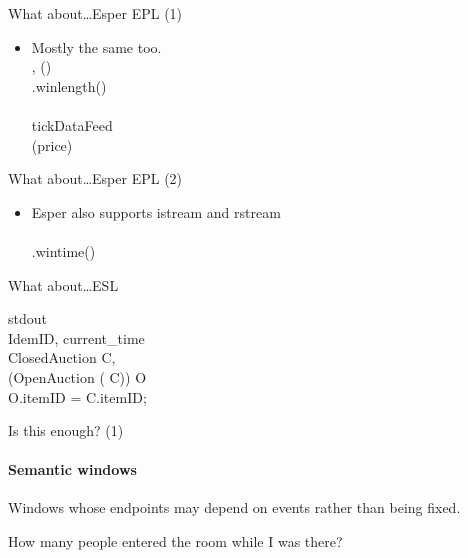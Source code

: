 \documentclass[brown, compress, mathserif]{beamer}
\begin{document}
\begin{frame}{What about\ldots Esper EPL (1)}
  \begin{itemize}
  \item Mostly the same too.
    \bigskip\\
     , ()\\
     \hlsym{(}.win\hlsym{:}length()\\
      \hlsym{$>$} \\
     tickDataFeed\\
     (price) \hlsym{$>$} 

  \end{itemize}
\end{frame}


\begin{frame}{What about\ldots Esper EPL (2)}
  \begin{itemize}
  \item Esper also supports \alert{istream} and \alert{rstream}
    \bigskip\\
     \hlsym{*}\\
     \hlsym{(}.win\hlsym{:}time()\\
  \end{itemize}
\end{frame}


\begin{frame}{What about\ldots ESL}
  \begin{footnotesize}
   stdout\\
   IdemID, current\_time \\
   ClosedAuction  C,\\
  (OpenAuction  (   C))  O\\
   O.itemID = C.itemID;
  \end{footnotesize}
\end{frame}

\begin{frame}{Is this enough? (1)}
  \framesubtitle{Semantic windows}
  \begin{definition}
    Windows whose endpoints may depend on events rather than being fixed.
  \end{definition}

  \begin{example}
    How many people entered the room while I was there?
  \end{example}
\end{frame}
\end{document}
